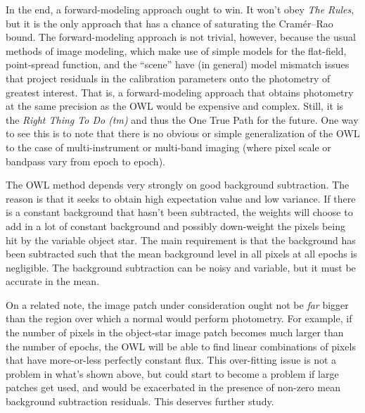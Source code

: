 \documentclass[12pt, letterpaper, preprint]{aastex}
\begin{document}
In the end, a forward-modeling approach ought to win.
It won't obey \emph{The Rules}, but it is the only approach that has a chance
  of saturating the Cram\'er--Rao bound.
The forward-modeling approach is not trivial, however,
  because the usual methods of image modeling,
  which make use of simple models for the flat-field, point-spread function,
  and the ``scene''
  have (in general) model mismatch issues that project residuals
  in the calibration parameters onto the photometry of greatest interest.
That is, a forward-modeling approach that obtains photometry at the same
  precision as the OWL would be expensive and complex.
Still, it is the \emph{Right Thing To Do (tm)} and thus the One True Path for the future.
One way to see this is to note that there is no obvious or simple generalization of the OWL
  to the case of multi-instrument or multi-band imaging
  (where pixel scale or bandpass vary from epoch to epoch).

The OWL method depends very strongly on good background subtraction.
The reason is that it seeks to obtain high expectation value and low variance.
If there is a constant background that hasn't been subtracted,
  the weights will choose to add in a lot of constant background
  and possibly down-weight the pixels being hit by the variable object star.
The main requirement is that the background has been subtracted such
  that the mean background level in all pixels at all epochs is negligible.
The background subtraction can be noisy and variable,
  but it must be accurate in the mean.

On a related note, the image patch under consideration ought not be \emph{far}
  bigger than the region over which a normal would perform photometry.
For example, if the number of pixels in the object-star image patch becomes
  much larger than the number of epochs,
  the OWL will be able to find linear combinations of pixels that have
  more-or-less perfectly constant flux.
This over-fitting issue is not a problem in what's shown above,
  but could start to become a problem if large patches get used,
  and would be exacerbated in the presence of non-zero mean background subtraction residuals.
This deserves further study.
\end{document}
